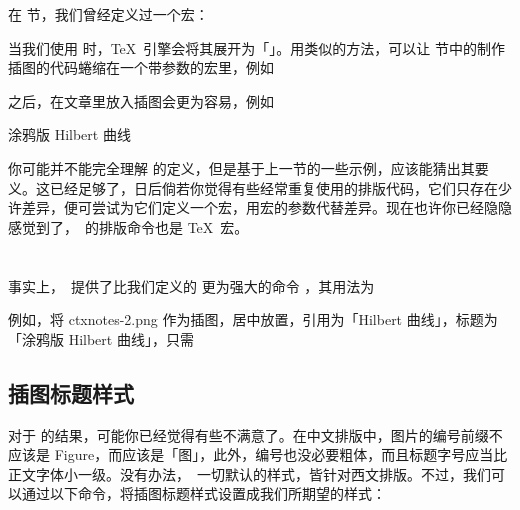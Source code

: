 在  节，我们曾经定义过一个宏：

\starttyping[option=TEX]
\stoptyping

\noindent 当我们使用 \type{\foo} 时，\TeX\ 引擎会将其展开为「」。用类似的方法，可以让 \in[figure] 节中的制作插图的代码蜷缩在一个带参数的宏里，例如

\starttyping[option=TEX]
\stoptyping

\noindent 之后，在文章里放入插图会更为容易，例如

\starttyping[option=TEX]
\placemyfigure
  {涂鸦版 Hilbert 曲线}
  {}
\stoptyping

你可能并不能完全理解 \type{\palcemyfigure} 的定义，但是基于上一节的一些示例，应该能猜出其要义。这已经足够了，日后倘若你觉得有些经常重复使用的排版代码，它们只存在少许差异，便可尝试为它们定义一个宏，用宏的参数代替差异。现在也许你已经隐隐感觉到了，\ConTeXt\ 的排版命令也是 \TeX\ 宏。

\section{\type{\placefigure}}

事实上，\ConTeXt\ 提供了比我们定义的 \type{\palcemyfigure} 更为强大的命令 \type{\palcefigure}，其用法为

\starttyping[option=TEX]
\stoptyping

例如，将 ctxnotes-2.png 作为插图，居中放置，引用为「Hilbert 曲线」，标题为「涂鸦版 Hilbert 曲线」，只需

\starttyping[option=TEX]
  {}
\stoptyping
{}

\subsection{插图标题样式}

对于 \type{\placefigure} 的结果，可能你已经觉得有些不满意了。在中文排版中，图片的编号前缀不应该是 Figure，而应该是「图」，此外，编号也没必要粗体，而且标题字号应当比正文字体小一级。没有办法，\ConTeXt\ 一切默认的样式，皆针对西文排版。不过，我们可以通过以下命令，将插图标题样式设置成我们所期望的样式：

